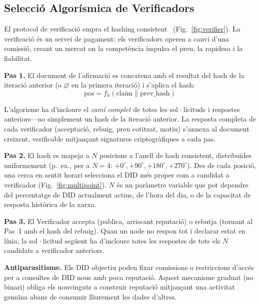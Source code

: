 \documentclass[11pt,a4paper,twocolumn]{article}
\begin{document}
\subsection{Selecció Algorísmica de Verificadors}

El protocol de verificació empra el hashing consistent~\cite{karger1997} (Fig.~\ref{fig:verifier}). La verificació és un servei de pagament: els verificadors operen a canvi d'una comissió, creant un mercat on la competència impulsa el preu, la rapidesa i la fiabilitat.

\textbf{Pas 1.} El document de l'afirmació es concatena amb el resultat del hash de la iteració anterior (o $\varnothing$ en la primera iteració) i s'aplica el hash:
\begin{equation}
\text{pos} = f_h(\text{claim} \| \text{prev\_hash})
\label{eq:hash}
\end{equation}

L'algorisme ha d'incloure el \emph{camí complet} de totes les sol·licituds i respostes anteriors---no simplement un hash de la iteració anterior. La resposta completa de cada verificador (acceptació, rebuig, preu cotitzat, motiu) s'annexa al document creixent, verificable mitjançant signatures criptogràfiques a cada pas.

\textbf{Pas 2.} El hash es mapeja a $N$ posicions a l'anell de hash consistent, distribuïdes uniformement (p.\ ex., per a $N=4$: $+0^{\circ}, +90^{\circ}, +180^{\circ}, +270^{\circ}$). Des de cada posició, una cerca en sentit horari selecciona el DID més proper com a candidat a verificador (Fig.~\ref{fig:multipoint}). $N$ és un paràmetre variable que pot dependre del percentatge de DID actualment actius, de l'hora del dia, o de la capacitat de resposta històrica de la xarxa.

\textbf{Pas 3.} El Verificador accepta (publica, arriscant reputació) o rebutja (tornant al Pas~1 amb el hash del rebuig). Quan un node no respon tot i declarar estat en línia, la sol·licitud següent ha d'incloure totes les respostes de tots els $N$ candidats a verificador anteriors.

\textbf{Antiparasitisme.} Els DID objectiu poden fixar comissions o restriccions d'accés per a consultes de DID nous amb poca reputació. Aquest mecanisme graduat (no binari) obliga els nouvinguts a construir reputació mitjançant una activitat genuïna abans de consumir lliurement les dades d'altres.
\end{document}
